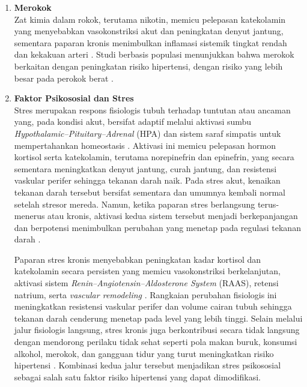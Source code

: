 \begin{enumerate}
    \item \textbf{Merokok}\\
    Zat kimia dalam rokok, terutama nikotin, memicu pelepasan katekolamin yang menyebabkan vasokonstriksi akut dan peningkatan denyut jantung, sementara paparan kronis menimbulkan inflamasi sistemik tingkat rendah dan kekakuan arteri \autocite{Gao2023Smoking}. Studi berbasis populasi menunjukkan bahwa merokok berkaitan dengan peningkatan risiko hipertensi, dengan risiko yang lebih besar pada perokok berat \autocite{Gao2023Smoking}.

   \item \textbf{Faktor Psikososial dan Stres}\\
    Stres merupakan respons fisiologis tubuh terhadap tuntutan atau ancaman yang, pada kondisi akut, bersifat adaptif melalui aktivasi sumbu \textit{Hypothalamic--Pituitary--Adrenal} (HPA) dan sistem saraf simpatis untuk mempertahankan homeostasis \autocite{russell2019human}. Aktivasi ini memicu pelepasan hormon kortisol serta katekolamin, terutama norepinefrin dan epinefrin, yang secara sementara meningkatkan denyut jantung, curah jantung, dan resistensi vaskular perifer sehingga tekanan darah naik. Pada stres akut, kenaikan tekanan darah tersebut bersifat sementara dan umumnya kembali normal setelah stresor mereda. Namun, ketika paparan stres berlangsung terus-menerus atau kronis, aktivasi kedua sistem tersebut menjadi berkepanjangan dan berpotensi menimbulkan perubahan yang menetap pada regulasi tekanan darah \autocite{Spruill2010}.

    Paparan stres kronis menyebabkan peningkatan kadar kortisol dan katekolamin secara persisten yang memicu vasokonstriksi berkelanjutan, aktivasi sistem \textit{Renin--Angiotensin--Aldosterone System} (RAAS), retensi natrium, serta \textit{vascular remodeling} \autocite{scalco2005hypertension}. Rangkaian perubahan fisiologis ini meningkatkan resistensi vaskular perifer dan volume cairan tubuh sehingga tekanan darah cenderung menetap pada level yang lebih tinggi. Selain melalui jalur fisiologis langsung, stres kronis juga berkontribusi secara tidak langsung dengan mendorong perilaku tidak sehat seperti pola makan buruk, konsumsi alkohol, merokok, dan gangguan tidur yang turut meningkatkan risiko hipertensi \autocite{Spruill2010}. Kombinasi kedua jalur tersebut menjadikan stres psikososial sebagai salah satu faktor risiko hipertensi yang dapat dimodifikasi.


\end{enumerate}
